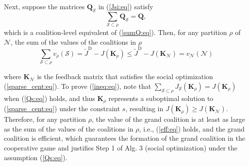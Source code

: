 \documentclass[12pt, draftclsnofoot,onecolumn]{IEEEtran}
\begin{document}
\noindent Next, suppose the matrices $\boldsymbol Q_{\mathcal S}$ in (\ref{Jsi:eq}) satisfy
\begin{equation}
 \sum_{\mathcal S \subset \rho}\boldsymbol Q_{\mathcal S} = \boldsymbol Q,
 \label{Qs:eq}
\end{equation}
\noindent which is a coalition-level equivalent of (\ref{sumQ:eq}). Then, for any partition $\rho$ of $\mathcal N$, the sum of the values of the coalitions in $\rho$
\begin{equation}
\sum_{\mathcal S \subset \rho}v_{\rho}(\mathcal S) = \tilde J^{\mathrm{D}} - J(\boldsymbol K_{\rho}) \leq \tilde J^{\mathrm{D}} - J(\boldsymbol K_{\mathcal N}) = v_{\mathcal N}(\mathcal N)
\label{ineq:eq}
\end{equation}

\noindent where $\boldsymbol K_{\mathcal N}$ is the feedback matrix that satisfies the social optimization (\ref{sparse_cent:eq}). To prove (\ref{ineq:eq}), note that $\sum_{\mathcal S \subset \rho} J_{\mathcal S}(\boldsymbol K_{\rho})=J(\boldsymbol K_{\rho})$ when (\ref{Qs:eq}) holds, and thus $\boldsymbol K_{\rho}$ represents a suboptimal solution to (\ref{sparse_cent:eq}) under the constraint $s$, resulting in $J(\boldsymbol K_{\rho}) \geq J(\boldsymbol K_{\mathcal N})$. Therefore, for any partition $\rho$, the value of the grand coalition is at least as large as the sum of the values of the coalitions in $\rho$, i.e., (\ref{eff:eq}) holds, and the grand coalition is efficient, which guarantees the formation of the grand coalition in the cooperative game and justifies Step 1 of Alg. 3 (social optimization) under the assumption (\ref{Qs:eq}).

\end{document}
